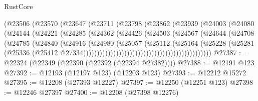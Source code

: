\begin{lexlean}{RustCore}
\begin{coremodule}
                                        (@23506
                                          (@23570
                                            (@23647
                                              (@23711
                                                (@23798
                                                  (@23862
                                                    (@23939
                                                      (@24003
                                                        (@24080
                                                          (@24144
                                                            (@24221
                                                              (@24285
                                                                (@24362
                                                                  (@24426
                                                                    (@24503
                                                                      (@24567
                                                                        (@24644
                                                                          (@24708
                                                                            (@24785
                                                                              (@24840
                                                                                (@24916
                                                                                  (@24980
                                                                                    (@25057
                                                                                      (@25112
                                                                                        (@25164
                                                                                          (@25228
                                                                                            (@25281
                                                                                              (@25336
                                                                                                (@25412
                                                                                                  @27334)))))))))))))))))))))))))))))))))))))))))))))))
@27387 := @22324 (@22349 (@22390 (@22392 (@22394 @27382))))
@27388 := @12191 @123
@27392 := @12193 (@12197 @123) (@12203 @123)
@27393 := @12212 @15272
@27395 := @12208 (@27393 @12227)
@27397 := @12250 (@12251 @123)
@27398 := @12246 @27397
@27400 := @12208 (@27398 @12276)

\end{coremodule}
\end{lexlean}
